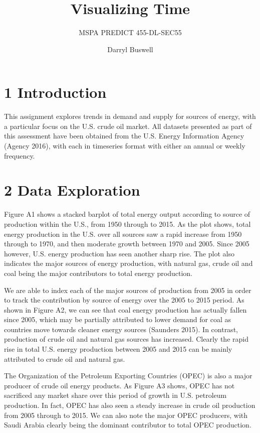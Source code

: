 \documentclass[]{article}
\title{Visualizing Time}
\subtitle{MSPA PREDICT 455-DL-SEC55}
\author{Darryl Buswell}
\date{}
\begin{document}
\maketitle

\newpage

\section{1 Introduction}\label{introduction}

This assignment explores trends in demand and supply for sources of
energy, with a particular focus on the U.S. crude oil market. All
datasets presented as part of this assessment have been obtained from
the U.S. Energy Information Agency (Agency 2016), with each in
timeseries format with either an annual or weekly frequency.

\section{2 Data Exploration}\label{data-exploration}

Figure A1 shows a stacked barplot of total energy output according to
source of production within the U.S., from 1950 through to 2015. As the
plot shows, total energy production in the U.S. over all sources saw a
rapid increase from 1950 through to 1970, and then moderate growth
between 1970 and 2005. Since 2005 however, U.S. energy production has
seen another sharp rise. The plot also indicates the major sources of
energy production, with natural gas, crude oil and coal being the major
contributors to total energy production.

We are able to index each of the major sources of production from 2005
in order to track the contribution by source of energy over the 2005 to
2015 period. As shown in Figure A2, we can see that coal energy
production has actually fallen since 2005, which may be partially
attributed to lower demand for coal as countries move towards cleaner
energy sources (Saunders 2015). In contrast, production of crude oil and
natural gas sources has increased. Clearly the rapid rise in total U.S.
energy production between 2005 and 2015 can be mainly attributed to
crude oil and natural gas.

The Organization of the Petroleum Exporting Countries (OPEC) is also a
major producer of crude oil energy products. As Figure A3 shows, OPEC
has not sacrificed any market share over this period of growth in U.S.
petroleum production. In fact, OPEC has also seen a steady increase in
crude oil production from 2005 through to 2015. We can also note the
major OPEC producers, with Saudi Arabia clearly being the dominant
contributor to total OPEC production.
\end{document}
